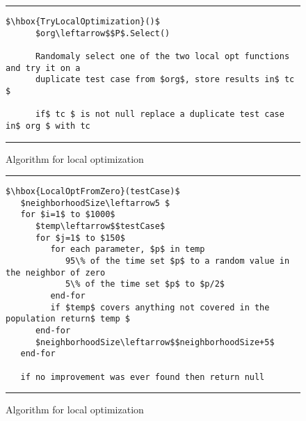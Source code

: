 \documentclass[runningheads]{llncs}
\begin{document}
\begin{figure}[h!]
\begin{center}
\hrule
\medskip
\begin{Verbatim}[fontfamily=tt, xleftmargin=10pt, commandchars=\\\{\},
codes={\catcode`$=3\catcode`^=7\catcode`_=8}]
$\hbox{TryLocalOptimization}()$
      $org\leftarrow$$P$.Select()
		
      Randomaly select one of the two local opt functions and try it on a 
      duplicate test case from $org$, store results in$ tc $
		
      if$ tc $ is not null replace a duplicate test case in$ org $ with tc
\end{Verbatim}
\hrule
\end{center}
\caption{Algorithm for local optimization \label{fig:lcOpt}}
\end{figure}

\begin{figure}[h!]
\begin{center}
\hrule
\medskip
\begin{Verbatim}[fontfamily=tt, xleftmargin=10pt, commandchars=\\\{\},
codes={\catcode`$=3\catcode`^=7\catcode`_=8}]
$\hbox{LocalOptFromZero}(testCase)$
   $neighborhoodSize\leftarrow5 $
   for $i=1$ to $1000$ 
      $temp\leftarrow$$testCase$
      for $j=1$ to $150$
         for each parameter, $p$ in temp
            95\% of the time set $p$ to a random value in the neighbor of zero
            5\% of the time set $p$ to $p/2$
         end-for     
         if $temp$ covers anything not covered in the population return$ temp $
      end-for
      $neighborhoodSize\leftarrow$$neighborhoodSize+5$
   end-for
		
   if no improvement was ever found then return null
\end{Verbatim}
\hrule
\end{center}
\caption{Algorithm for local optimization \label{fig:lcOptFZ}}
\end{figure}
\end{document}
